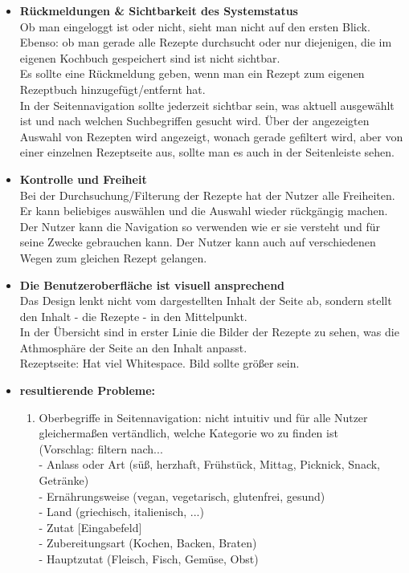 \documentclass[parskip,10pt,abstracton]{scrartcl}
\begin{document}
\begin{itemize}
 \item \textbf{Rückmeldungen \& Sichtbarkeit des Systemstatus}\\
 Ob man eingeloggt ist oder nicht, sieht man nicht auf den ersten Blick.\\
 Ebenso: ob man gerade alle Rezepte durchsucht oder nur diejenigen, die im eigenen Kochbuch gespeichert sind ist nicht sichtbar.\\
 Es sollte eine Rückmeldung geben, wenn man ein Rezept zum eigenen Rezeptbuch hinzugefügt/entfernt hat.\\
 In der Seitennavigation sollte jederzeit sichtbar sein, was aktuell ausgewählt ist und nach welchen Suchbegriffen gesucht wird. Über der angezeigten Auswahl von Rezepten wird angezeigt, wonach gerade gefiltert wird, aber von einer einzelnen Rezeptseite aus, sollte man es auch in der Seitenleiste sehen.

 \item \textbf{Kontrolle und Freiheit}\\
 Bei der Durchsuchung/Filterung der Rezepte hat der Nutzer alle Freiheiten. Er kann beliebiges auswählen und die Auswahl wieder rückgängig machen. Der Nutzer kann die Navigation so verwenden wie er sie versteht und für seine Zwecke gebrauchen kann. Der Nutzer kann auch auf verschiedenen Wegen zum gleichen Rezept gelangen.

 \item \textbf{Die Benutzeroberfläche ist visuell ansprechend}\\
 Das Design lenkt nicht vom dargestellten Inhalt der Seite ab, sondern stellt den Inhalt - die Rezepte - in den Mittelpunkt.\\
 In der Übersicht sind in erster Linie die Bilder der Rezepte zu sehen, was die Athmosphäre der Seite an den Inhalt anpasst.\\
 Rezeptseite: Hat viel Whitespace. Bild sollte größer sein.

\item \textbf{resultierende Probleme:}
\begin{enumerate}[o]
 \item Oberbegriffe in Seitennavigation: nicht intuitiv und für alle Nutzer gleichermaßen vertändlich, welche Kategorie wo zu finden ist\\
(Vorschlag: filtern nach... \\
 - Anlass oder Art (süß, herzhaft, Frühstück, Mittag, Picknick, Snack, Getränke) \\
 - Ernährungsweise (vegan, vegetarisch, glutenfrei, gesund) \\
 - Land (griechisch, italienisch, ...) \\
 - Zutat [Eingabefeld] \\
 - Zubereitungsart (Kochen, Backen, Braten) \\
 - Hauptzutat (Fleisch, Fisch, Gemüse, Obst)


\end{enumerate}
\end{itemize}
\end{document}
